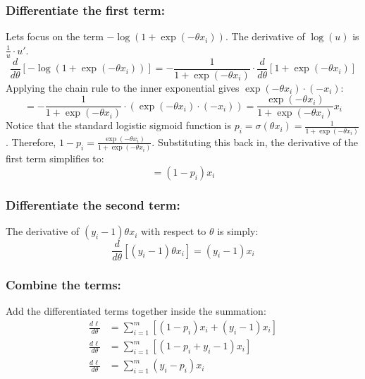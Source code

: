 \documentclass[twoside, 10pt]{article}
\begin{document}
\subsubsection{Differentiate the first term:}
Lets focus on the term $-\log(1 + \exp(-\theta x_i))$. The derivative of $\log(u)$ is $\frac{1}{u} \cdot u'$.
\[
\frac{d}{d\theta} \left[ -\log(1 + \exp(-\theta x_i)) \right] = -\frac{1}{1 + \exp(-\theta x_i)} \cdot \frac{d}{d\theta} \left[ 1 + \exp(-\theta x_i) \right]
\]
Applying the chain rule to the inner exponential gives $\exp(-\theta x_i) \cdot (-x_i)$:
\[
= -\frac{1}{1 + \exp(-\theta x_i)} \cdot \left( \exp(-\theta x_i) \cdot (-x_i) \right) = \frac{\exp(-\theta x_i)}{1 + \exp(-\theta x_i)} x_i
\]
Notice that the standard logistic sigmoid function is $p_i = \sigma(\theta x_i) = \frac{1}{1 + \exp(-\theta x_i)}$. Therefore, $1 - p_i = \frac{\exp(-\theta x_i)}{1 + \exp(-\theta x_i)}$. Substituting this back in, the derivative of the first term simplifies to:
\[
= (1 - p_i) x_i
\]
\subsubsection{Differentiate the second term:} 
The derivative of $(y_i - 1)\theta x_i$ with respect to $\theta$ is simply:
\[
\frac{d}{d\theta} \left[ (y_i - 1)\theta x_i \right] = (y_i - 1) x_i
\]
\subsubsection{Combine the terms:} 
Add the differentiated terms together inside the summation:
\begin{align*}
\frac{d\ell}{d\theta} &= \sum_{i=1}^m \left[ (1 - p_i) x_i + (y_i - 1) x_i \right] \\
\frac{d\ell}{d\theta} &= \sum_{i=1}^m \left[ (1 - p_i + y_i - 1) x_i \right] \\
\frac{d\ell}{d\theta} &= \sum_{i=1}^m (y_i - p_i) x_i
\end{align*}
\end{document}
